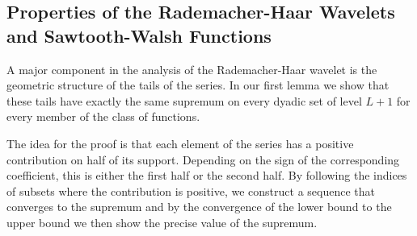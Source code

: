 \documentclass[twoside,11pt]{article}
\begin{document}
\subsection{Properties of the Rademacher-Haar Wavelets and Sawtooth-Walsh Functions}
\label{sec:rad_haar_properties}

A major component in the analysis of the Rademacher-Haar wavelet is the geometric structure of the tails of the series.
In our first lemma we show that these tails have exactly the same supremum on every dyadic set of level $L+1$ for every member of the class of functions.
The idea for the proof is that each element of the series has a positive contribution on half of its support.
Depending on the sign of the corresponding coefficient, this is either the first half or the second half.
By following the indices of subsets where the contribution is positive, we construct a sequence that converges to the supremum and by the convergence of the lower bound to the upper bound we then show the precise value of the supremum.
\end{document}
